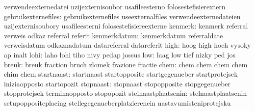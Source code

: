                                   verwendeexternedatei             uzijexternisoubor
                                  usafileesterno                   folosestefisierextern
             gebruikexternefiles: gebruikexternefiles              useexternalfiles
                                  verwendeexternedateien           uzijexternisoubory
                                  usafileesterni                   folosestefisiereexterne
                         kenmerk: kenmerk                          referral
                                  verweis                          odkaz
                                  referral                         referit %
                    kenmerkdatum: kenmerkdatum                     referraldate
                                  verweisdatum                     odkaznadatum
                                  datareferral                     datareferit
                            high: hoog                             high
                                  hoch                             vysoky
                                  ap                               inalt
                            lohi: laho                             lohi
                                  tiho                             nivy
                                  pedap                            jossus
                             low: laag                             low
                                  tief                             nizky
                                  ped                              jos
                           breuk: breuk                            fraction
                                  bruch                            zlomek
                                  frazione                         fractie
                            chem: chem                             chem
                                  chem                             chem
                                  chim                             chem
                      startnaast: startnaast                       startopposite
                                  startgegenueber                  startprotejsek
                                  iniziaopposto                    startopozit
                       stopnaast: stopnaast                        stopopposite
                                  stopgegenueber                   stopprotejsek
                                  terminaopposto                   stopopozit
             stelnaastplaatsenin: stelnaastplaatsenin              setupoppositeplacing
                                  stellegegenueberplatzierenein    nastavumisteniprotejsku
